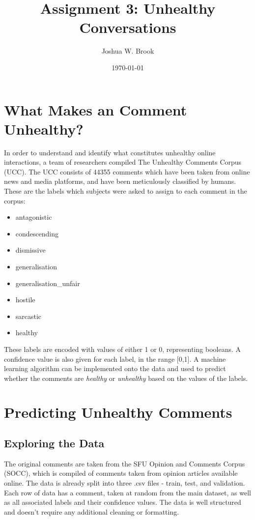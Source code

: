 \documentclass[11pt]{article}
\author{Joshua W. Brook}
\date{\today}
\title{Assignment 3: Unhealthy Conversations}
\begin{document}
\maketitle

\section{What Makes an Comment Unhealthy?}
\label{sec:org7e9ede8}

In order to understand and identify what constitutes unhealthy online interactions, a team of researchers compiled The Unhealthy Comments Corpus (UCC).
The UCC consists of 44355 comments which have been taken from online news and media platforms, and have been meticulously classified by humans. 
These are the labels which subjects were asked to assign to each comment in the corpus:

\begin{itemize}
\item antagonistic
\item condescending
\item dismissive
\item generalisation
\item generalisation\_unfair
\item hostile
\item sarcastic
\item healthy
\end{itemize}

\noindent
These labels are encoded with values of either 1 or 0, representing booleans. 
A confidence value is also given for each label, in the range [0,1].
A machine learning algorithm can be implemented onto the data and used to predict whether the comments are \emph{healthy} or \emph{unhealthy} based on the values of the labels.


\section{Predicting Unhealthy Comments}
\label{sec:orgf1d2871}

\subsection{Exploring the Data}
\label{sec:orgee6b8f0}

The original comments are taken from the SFU Opinion and Comments Corpus (SOCC), which is compiled of comments taken from opinion articles available online.
The data is already split into three .csv files - train, test, and validation.
Each row of data has a comment, taken at random from the main dataset, as well as all associated labels and their confidence values.
The data is well structured and doesn't require any additional cleaning or formatting.
\end{document}
